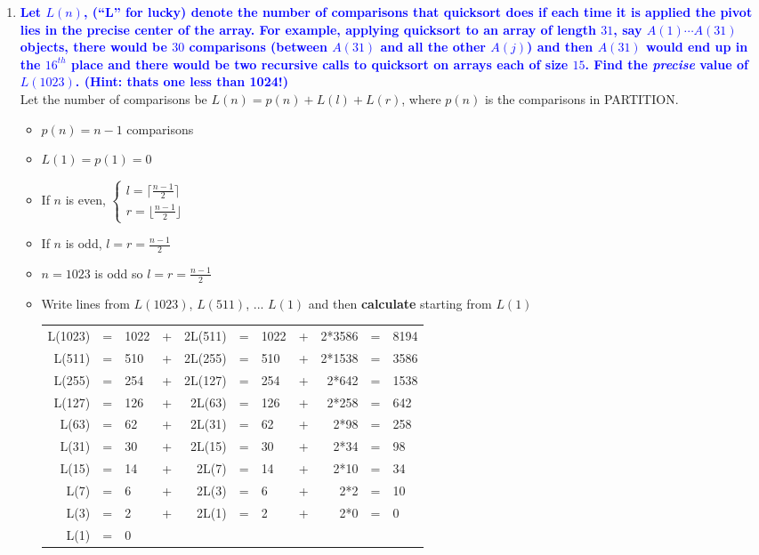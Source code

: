 \documentclass[11pt]{article}
\begin{document}
\begin{enumerate}
\item \textbf{\textcolor{blue}{Let $L(n)$, (``L'' for lucky) denote the number of comparisons that quicksort does if each time it is applied the pivot lies in the precise center of the array. For example, applying quicksort to an array of length $31$, say $A(1)\cdots A(31)$ objects, there would be $30$ comparisons (between $A(31)$ and all the other $A(j)$) and then $A(31)$ would end up in the $16^{th}$ place and there would be two recursive calls to quicksort on arrays each of size $15$. Find the {\em precise} value of $L(1023)$. (Hint: thats one less than 1024!)}}
    \\ Let the number of comparisons be $L(n) = p(n) + L(l) + L(r)$, where $p(n)$ is the comparisons in PARTITION.
    \begin{itemize}
        \item $p(n) = n - 1$ comparisons
        \item $L(1) = p(1) = 0$
        \item If $n$ is even, $\left\{\begin{array}{ll}
                                l = \lceil \frac{n-1}{2} \rceil \\
                                r = \lfloor \frac{n-1}{2} \rfloor
                                \end{array}\right.$
        \item If $n$ is odd, $l = r = \frac{n-1}{2}$
        \item $n = 1023$ is odd so $l = r = \frac{n-1}{2}$
        \item Write lines from $L(1023)$, $L(511)$, ... $L(1)$ and then \textbf{calculate} starting from $L(1)$
            \\
            \begin{tabular}{rclcrclcrcl}
            \\ L(1023) &=& 1022 &+& 2L(511) &=&1022 &+& 2*3586 &=& 8194
            \\ L(511)  &=&  510 &+& 2L(255) &=& 510 &+& 2*1538 &=& 3586
            \\ L(255)  &=&  254 &+& 2L(127) &=& 254 &+& 2*642  &=& 1538
            \\ L(127)  &=&  126 &+& 2L(63)  &=& 126 &+& 2*258  &=& 642
            \\ L(63)   &=&   62 &+& 2L(31)  &=&  62 &+& 2*98   &=& 258
            \\ L(31)   &=&   30 &+& 2L(15)  &=&  30 &+& 2*34   &=& 98
            \\ L(15)   &=&   14 &+& 2L(7)   &=&  14 &+& 2*10   &=& 34
            \\ L(7)    &=&    6 &+& 2L(3)   &=&   6 &+& 2*2    &=& 10
            \\ L(3)    &=&    2 &+& 2L(1)   &=&   2 &+& 2*0    &=& 0
            \\ L(1)    &=&    0  
            \end{tabular}
    \end{itemize}


\end{enumerate}
\end{document}
